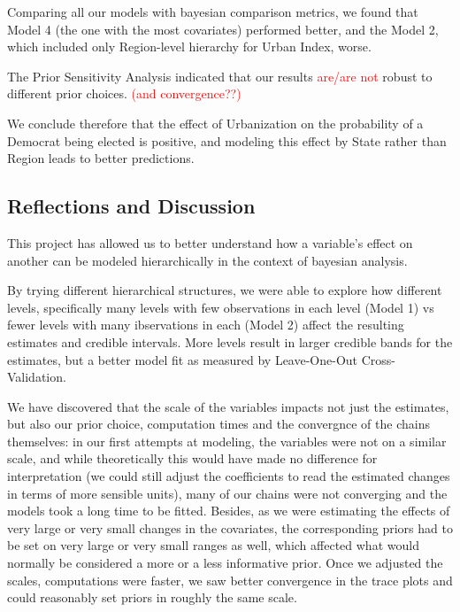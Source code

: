 \documentclass[12pt]{article}
\newcommand{\red}[1]{\textcolor{red}{#1}}
\begin{document}
Comparing all our models with bayesian comparison metrics, we found that Model 4 (the one with the most covariates) performed better, and the Model 2, which included only Region-level hierarchy for Urban Index, worse. 

The Prior Sensitivity Analysis indicated that our results \red{are/are not} robust to different prior choices. \red{(and convergence??)}

We conclude therefore that the effect of Urbanization on the probability of a Democrat being elected is positive, and modeling this effect by State rather than Region leads to better predictions.



\subsection{Reflections and Discussion}

This project has allowed us to better understand how a variable's effect on another can be modeled hierarchically in the context of bayesian analysis.


By trying different hierarchical structures, we were able to explore how different levels, specifically many levels with few observations in each level (Model 1) vs fewer levels with many ibservations in each (Model 2) affect the resulting estimates and credible intervals. More levels result in larger credible bands for the estimates, but a better model fit as measured by Leave-One-Out Cross-Validation. 

We have discovered that the scale of the variables impacts not just the estimates, but also our prior choice, computation times and the convergnce of the chains themselves: in our first attempts at modeling, the variables were not on a similar scale, and while theoretically this would have made no difference for interpretation (we could still adjust the coefficients to read the estimated changes in terms of more sensible units), many of our chains were not converging and the models took a long time to be fitted.
Besides, as we were estimating the effects of very large or very small changes in the covariates, the corresponding priors had to be set on very large or very small ranges as well, which affected what would normally be considered a more or a less informative prior. Once we adjusted the scales, computations were faster, we saw better convergence in the trace plots and could reasonably set priors in roughly the same scale.
\end{document}
